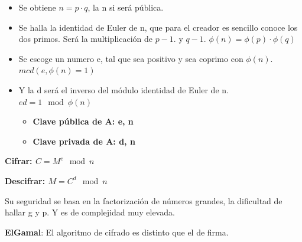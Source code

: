 \documentclass[12pt, twoside, openright]{report} %
\begin{document}
\begin{itemize}
\begin{itemize}
\begin{itemize}
      \item Se obtiene $n=p\cdot q$, la n si será pública.
        
      \item Se halla la identidad de Euler de n, que para el creador es
        sencillo conoce los dos primos. Será la multiplicación de $p-1$. y
        $q-1$. $\phi(n) = \phi(p)\cdot\phi(q)$
        
      \item Se escoge un numero e, tal que sea positivo y sea coprimo con
        $\phi (n)$. $mcd(e, \phi(n)=1)$
        
      \item Y la d será el inverso del módulo identidad de Euler de n.
        $ed = 1 \mod \phi (n)$
        

        \begin{itemize}
        \item \textbf{Clave pública de A: e, n}
          
        \item \textbf{Clave privada de A: d, n}
          
        \end{itemize}
      \end{itemize}
    \end{itemize}
  \end{itemize}

  
\textbf{Cifrar: $C=M^e \mod n$}

\textbf{Descifrar: $M=C^d \mod n$}

  
  Su seguridad se basa en la factorización de números grandes, la
  dificultad de hallar g y p. Y es de complejidad muy elevada.
  

  
  \textbf{ElGamal}: El algoritmo de cifrado es distinto que el de firma.
  
\end{document}

